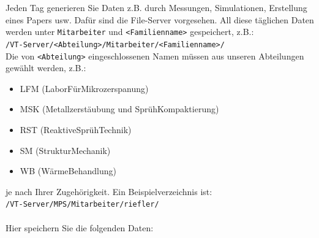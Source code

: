 Jeden Tag generieren Sie Daten z.B. durch Messungen, Simulationen, Erstellung
eines Papers usw. Dafür sind die File-Server vorgesehen. All diese täglichen
Daten werden unter \texttt{Mitarbeiter} und \texttt{<Familienname>} gespeichert,
z.B.: \\
\texttt{/VT-Server/<Abteilung>/Mitarbeiter/<Familienname>/} \\
Die von \texttt{<Abteilung>} eingeschlossenen Namen müssen aus unseren
Abteilungen gewählt werden, z.B.:
\begin{itemize}
  \item LFM (LaborFürMikrozerspanung)
  \item MSK (Metallzerstäubung und SprühKompaktierung)
  \item RST (ReaktiveSprühTechnik)
  \item SM (StrukturMechanik)
  \item WB (WärmeBehandlung)
\end{itemize}
je nach Ihrer Zugehörigkeit. Ein Beispielverzeichnis ist: \\
\texttt{/VT-Server/MPS/Mitarbeiter/riefler/} \\
\\
Hier speichern Sie die folgenden Daten:
